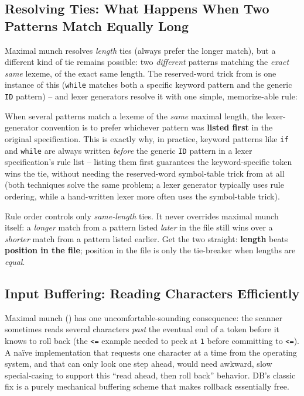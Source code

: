 \documentclass[full-course-notes.tex]{subfiles}
\begin{document}
\subsection{Resolving Ties: What Happens When Two Patterns Match Equally Long}
\label{sec:l6-lexgen-ties}

\dbtag Maximal munch resolves \emph{length} ties (always prefer the longer match), but a
different kind of tie remains possible: two \emph{different} patterns matching the \emph{exact
same} lexeme, of the exact same length. The reserved-word trick from  is
one instance of this (\texttt{while} matches both a specific keyword pattern and the generic
\texttt{ID} pattern) -- and lexer generators resolve it with one simple, memorize-able rule:

\begin{coreidea}
When several patterns match a lexeme of the \emph{same} maximal length, the lexer-generator
convention is to prefer whichever pattern was \textbf{listed first} in the original
specification. This is exactly why, in practice, keyword patterns like \texttt{if} and
\texttt{while} are always written \emph{before} the generic \texttt{ID} pattern in a lexer
specification's rule list -- listing them first guarantees the keyword-specific token wins the
tie, without needing the reserved-word symbol-table trick from  at all
(both techniques solve the same problem; a lexer generator typically uses rule ordering, while a
hand-written lexer more often uses the symbol-table trick).
\end{coreidea}

\begin{examfocus}
Rule order controls only \emph{same-length} ties. It never overrides maximal munch itself: a
\emph{longer} match from a pattern listed \emph{later} in the file still wins over a
\emph{shorter} match from a pattern listed earlier. Get the two straight: \textbf{length} beats
\textbf{position in the file}; position in the file is only the tie-breaker when lengths are
\emph{equal}.
\end{examfocus}

\subsection{Input Buffering: Reading Characters Efficiently}
\label{sec:l6-lexgen-buffering}

\dbtag Maximal munch () has one uncomfortable-sounding
consequence: the scanner sometimes reads several characters \emph{past} the eventual end of a
token before it knows to roll back (the \texttt{<=} example needed to peek at \texttt{1} before
committing to \texttt{<=}). A na\"ive implementation that requests one character at a time from
the operating system, and that can only look one step ahead, would need awkward, slow
special-casing to support this ``read ahead, then roll back'' behavior. DB's classic fix is a
purely mechanical buffering scheme that makes rollback essentially free.
\end{document}
